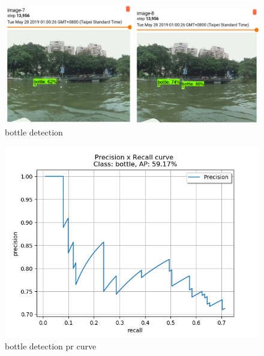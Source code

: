 \begin{figure}[H]
    \includegraphics[width=1\columnwidth]{images/bottle.png}
    \centering
    \caption{bottle detection}
    \label{figure:bottle_dt}
\end{figure}


\begin{figure}[H]
    \includegraphics[width=1\columnwidth]{images/bottle_pr.png}
    \centering
    \caption{bottle detection pr curve}
    \label{figure:bottle_pr}
\end{figure}